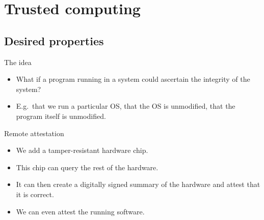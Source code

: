 \mode*




\section{Trusted computing}

\subsection{Desired properties}

\begin{frame}
  \begin{block}{The idea}
    \begin{itemize}
      \item What if a program running in a system could ascertain the integrity 
        of the system?

      \item E.g.\ that we run a particular OS, that the OS is unmodified, that 
        the program itself is unmodified.

    \end{itemize}
  \end{block}
\end{frame}

\begin{frame}
  \begin{block}{Remote attestation}
    \begin{itemize}
      \item We add a tamper-resistant hardware chip.
      \item This chip can query the rest of the hardware.
      \item It can then create a digitally signed summary of the hardware and 
        attest that it is correct.

        \pause{}

      \item We can even attest the running software.
    \end{itemize}
  \end{block}
\end{frame}

